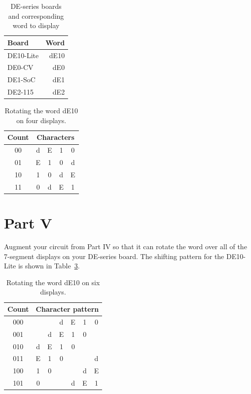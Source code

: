 \documentclass[epsfig,10pt,fullpage]{article}
\newcommand{\CommonDocsPath}{../../../common/docs}
\begin{document}
\begin{table}[H]
\begin{center}
	\begin{tabular}{l | r}
	Board & Word \\
	\hline
	{\rule[0mm]{0mm}{5mm}}DE10-Lite & dE10 \\
	DE0-CV &  dE0 \\
	DE1-SoC &  dE1 \\
	DE2-115 &  dE2 \\
	\end{tabular}
	\caption{DE-series boards and corresponding word to display}
	\label{tab:word}
	\end{center}
\end{table}

\begin{table}[H]
\begin{minipage}[t]{12.5 cm}
\begin{center}
\begin{tabular}{c|cccc}
Count& \multicolumn{4}{c}{Characters} \\
\hline
{\rule[0mm]{0mm}{5mm}00} & d & E & 1 & 0\\ 
01 & E & 1 & 0 & d\\
10 & 1 & 0 & d & E\\
11 & 0 & d & E & 1\\
\end{tabular}
\end{center}
\end{minipage}
\caption{Rotating the word dE10 on four displays.}
\label{tab:rotate}
\end{table}

\section*{Part V}
Augment your circuit from Part IV so that it can rotate the word over all of the
7-segment displays on your DE-series board. The shifting pattern for the DE10-Lite is shown in
Table~\ref{tab:rotate2}.

\begin{table}[h]
\begin{minipage}[t]{12.5 cm}
\begin{center}
\begin{tabular}{c|cccccc}
Count& \multicolumn{6}{c}{Character pattern} \\
\hline
{\rule[0mm]{0mm}{5mm}000} & & & d & E & 1 & 0 \\ 
001 & & d & E & 1 & 0 & \\
010 & d & E & 1 & 0 & & \\
011 & E & 1 & 0 & & & d\\
100 & 1 & 0 & & & d & E \\
101 & 0 & & & d  & E & 1 \\
\end{tabular}
\end{center}
\end{minipage}
\caption{Rotating the word dE10 on six displays.}
\label{tab:rotate2}
\end{table}



\end{document}
